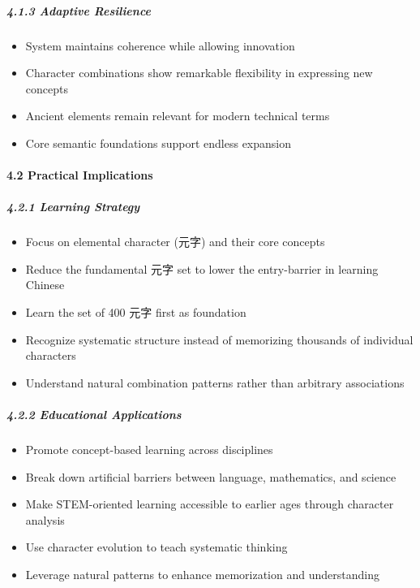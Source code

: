 \hypertarget{adaptive-resilience}{%
\subparagraph{4.1.3 Adaptive Resilience}\label{adaptive-resilience}}

\begin{itemize}
\tightlist
\item
  System maintains coherence while allowing innovation
\item
  Character combinations show remarkable flexibility in expressing new
  concepts
\item
  Ancient elements remain relevant for modern technical terms
\item
  Core semantic foundations support endless expansion
\end{itemize}

\hypertarget{practical-implications}{%
\paragraph{4.2 Practical Implications}\label{practical-implications}}

\hypertarget{learning-strategy}{%
\subparagraph{4.2.1 Learning Strategy}\label{learning-strategy}}

\begin{itemize}
\tightlist
\item
  Focus on elemental character (元字) and their core concepts
\item
  Reduce the fundamental 元字 set to lower the entry-barrier in learning
  Chinese
\item
  Learn the set of 400 元字 first as foundation
\item
  Recognize systematic structure instead of memorizing thousands of
  individual characters
\item
  Understand natural combination patterns rather than arbitrary
  associations
\end{itemize}

\hypertarget{educational-applications}{%
\subparagraph{4.2.2 Educational
Applications}\label{educational-applications}}

\begin{itemize}
\tightlist
\item
  Promote concept-based learning across disciplines
\item
  Break down artificial barriers between language, mathematics, and
  science
\item
  Make STEM-oriented learning accessible to earlier ages through
  character analysis
\item
  Use character evolution to teach systematic thinking
\item
  Leverage natural patterns to enhance memorization and understanding
\end{itemize}

